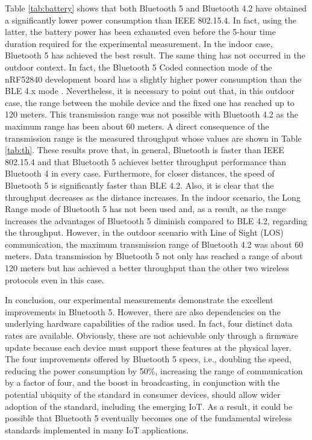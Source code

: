 \documentclass[12pt, draftclsnofoot, onecolumn]{IEEEtran}
\begin{document}
Table \ref{tab:battery} shows that both Bluetooth 5 and Bluetooth 4.2 have obtained a significantly lower power consumption than IEEE 802.15.4. In fact, using the latter, the battery power has been exhausted even before the 5-hour time duration required for the experimental measurement. In the indoor case, Bluetooth 5 has achieved the best result. The same thing has not occurred in the outdoor context. In fact, the Bluetooth 5 Coded connection mode of the nRF52840 development board has a slightly higher power consumption than the BLE 4.x mode \cite{nordic}. Nevertheless, it is necessary to point out that, in this outdoor case, the range between the mobile device and the fixed one has reached up to 120 meters. This transmission range was not possible with Bluetooth 4.2 as the maximum range has been about 60 meters. A direct consequence of the transmission range is the measured throughput whose values are shown in Table \ref{tab:th}. These results prove that, in general, Bluetooth is faster than IEEE 802.15.4 and that Bluetooth 5 achieves better throughput performance than Bluetooth 4 in every case. Furthermore, for closer distances, the speed of Bluetooth 5 is significantly faster than BLE 4.2. Also, it is clear that the throughput decreases as the distance increases. In the indoor scenario, the Long Range mode of Bluetooth 5 has not been used and, as a result, as the range increases the advantages of Bluetooth 5 diminish compared to BLE 4.2, regarding the throughput. However, in the outdoor scenario with Line of Sight (LOS) communication, the maximum transmission range of Bluetooth 4.2 was about 60 meters. Data transmission by Bluetooth 5 not only has reached a range of about 120 meters but has achieved a better throughput than the other two wireless protocols even in this case.

In conclusion, our experimental measurements demonstrate the excellent improvements in Bluetooth 5. However, there are also dependencies on the underlying hardware capabilities of the radios used. In fact, four distinct data rates are available. Obviously, these are not achievable only through a firmware update because each device must support these features at the physical layer. The four improvements offered by Bluetooth 5 specs, i.e., doubling the speed, reducing the power consumption by 50\%, increasing the range of communication by a factor of four, and the boost in broadcasting, in conjunction with the potential ubiquity of the standard in consumer devices, should allow wider adoption of the standard, including the emerging IoT. As a result, it could be possible that Bluetooth 5 eventually becomes one of the fundamental wireless standards implemented in many IoT applications.
\end{document}
